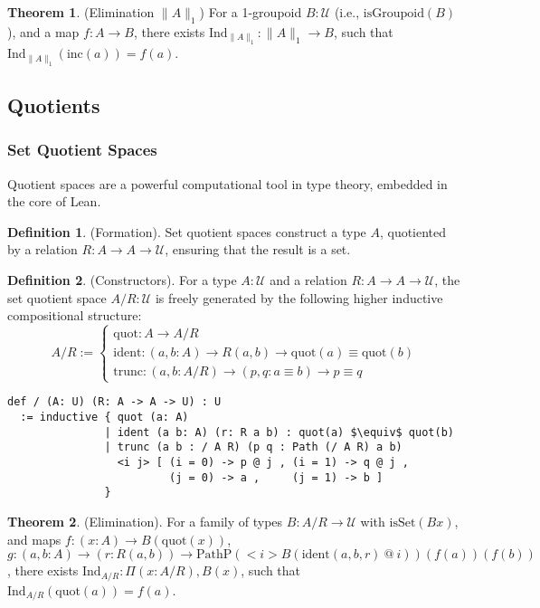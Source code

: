 \documentclass{article}
\theoremstyle{definition}
\newtheorem{theorem}{Theorem}
\newtheorem{definition}{Definition}
\begin{document}
\begin{theorem} (Elimination \( \| A \|_1 \))
For a 1-groupoid \( B : \mathcal{U} \) (i.e., \( \text{isGroupoid}(B) \)),
and a map \( f : A \to B \), there exists \( \text{Ind}_{\|A\|_1} : \|A\|_1 \to B \),
such that \( \text{Ind}_{\|A\|_1}(\text{inc}(a)) = f(a) \).
\end{theorem}

\newpage
\subsection{Quotients}
\subsubsection*{Set Quotient Spaces}
Quotient spaces are a powerful computational tool in type theory, embedded
in the core of Lean.
\begin{definition} (Formation).
Set quotient spaces construct a type \( A \), quotiented by
a relation \( R : A \to A \to \mathcal{U} \), ensuring that the result is a set.
\end{definition}

\begin{definition} (Constructors).
For a type \( A : \mathcal{U} \) and a relation \( R : A \to A \to \mathcal{U} \),
the set quotient space \( A / R : \mathcal{U} \) is freely generated by the following
higher inductive compositional structure:
\[
A / R :=
\begin{cases}
\text{quot} : A \to A / R \\
\text{ident} : (a, b : A) \to R(a,b) \to \text{quot}(a) \equiv \text{quot}(b) \\
\text{trunc} : (a, b : A / R) \to (p, q : a \equiv b) \to p \equiv q
\end{cases}
\]
\begin{lstlisting}[mathescape=true]
def / (A: U) (R: A -> A -> U) : U
  := inductive { quot (a: A)
               | ident (a b: A) (r: R a b) : quot(a) $\equiv$ quot(b)
               | trunc (a b : / A R) (p q : Path (/ A R) a b)
                 <i j> [ (i = 0) -> p @ j , (i = 1) -> q @ j ,
                         (j = 0) -> a ,     (j = 1) -> b ]
               }
\end{lstlisting}
\end{definition}

\begin{theorem} (Elimination).
For a family of types \( B : A/R \to \mathcal{U} \) with \( \text{isSet}(B x) \),
and maps \( f : (x : A) \to B(\text{quot}(x)) \),
\( g : (a, b : A) \to (r : R(a,b)) \to \text{PathP} (<i> B(\text{ident}(a,b,r)\ @\ i)) (f(a)) (f(b)) \),
there exists \( \text{Ind}_{A/R} : \Pi (x: A/R), B(x) \), such that \( \text{Ind}_{A/R}(\text{quot}(a)) = f(a) \).
\end{theorem}
\end{document}
